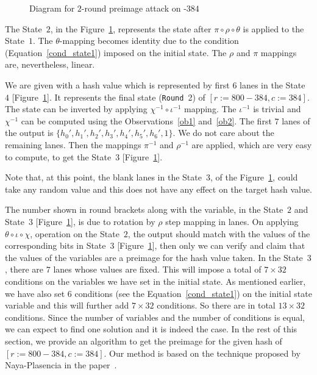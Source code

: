 \begin{figure}[!t]
\begin{center}
{
}
\caption{Diagram for $2$-round preimage attack on \Keccak-$384$ \label{atk}}
\end{center}
\end{figure}
The State~$2$, in the Figure~\ref{atk}, represents the state after $\pi \circ \rho \circ \theta$ is applied to the State~$1$. 
The $\theta$-mapping becomes identity due to the condition
(Equation~\ref{cond_state1}) imposed on the initial state. 
The $\rho$ and $\pi$ mappings are, nevertheless, linear.

We are given with a hash value which is represented by first $6$ lanes in the State~$4$ [Figure~\ref{atk}]. It represents the final state ({\tt Round}~2) of \KECCAK{}$[r:=800-384, c:=384]$. The state can be inverted by applying $\chi^{-1} \circ \iota^{-1}$ mapping. The $\iota^{-1}$ is trivial and $\chi^{-1}$ can be computed using the Observations~\ref{ob1} and~\ref{ob2}. The first $7$ lanes of the output is $\{h_0',h_1',h_2',h_3',h_4',h_5',h_6',1\}$. We do not care about the remaining  lanes. 
Then the mappings $\pi^{-1}$ and $\rho^{-1}$ are applied, which are very easy to compute, to get the State~$3$ [Figure~\ref{atk}]. 

Note that, at this point, the blank lanes in the State~$3$, of the Figure~\ref{atk}, could take any random value and this does not have any effect on the target hash value.

The number shown in round brackets along with the variable, in the State~$2$ and State~$3$ [Figure~\ref{atk}], is due to rotation by $\rho$ step mapping in lanes.
On applying $\theta \circ \iota \circ \chi$, operation on the State~$2$, the output should match with the values of the corresponding bits in State~$3$ [Figure~\ref{atk}], then only we can verify and claim that the values of the variables are a preimage for the hash value taken. In the State~$3$, there are $7$ lanes whose values are fixed. 
This will impose a total of $7\times 32$ conditions on the variables we have set in the initial state. As mentioned earlier, we have also set $6$ conditions (see the Equation~\ref{cond_state1}) on the initial state variable and this will further add $7 \times 32$ conditions. So there are in total $13\times 32$ conditions. Since the number of variables and the number of conditions is equal, we can expect to find one solution and it is indeed the case. In the rest of this section, we provide an algorithm to get the preimage for the given hash of  \KECCAK{}$[r:=800-384, c:=384]$. Our method is based on the technique proposed by Naya-Plasencia \etal in the paper~\cite{naya2011practical}.

